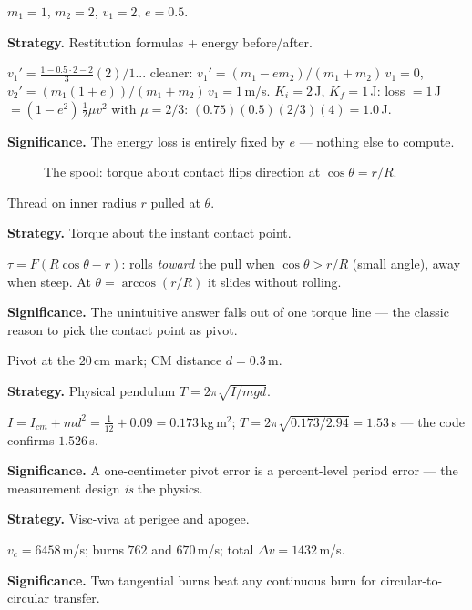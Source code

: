 \begin{example}\label{ex:w4}
$m_1=1$, $m_2=2$, $v_1=2$, $e=0.5$.
\par\smallskip
\textbf{Strategy.} Restitution formulas + energy before/after.
\begin{solution}
$v_1'=\frac{1-0.5\cdot2-2}{3}(2)/1$... cleaner:
$v_1'=(m_1-em_2)/(m_1+m_2)\,v_1=0$,
$v_2'=(m_1(1+e))/(m_1+m_2)\,v_1=1$\,m/s.
$K_i=2$\,J, $K_f=1$\,J: loss $=1$\,J $=(1-e^{2})\,\frac12\mu v^{2}$
with $\mu=2/3$: $(0.75)(0.5)(2/3)(4)=1.0$\,J. \checkmark
\end{solution}
\textbf{Significance.} The energy loss is entirely fixed by $e$ ---
nothing else to compute.
\end{example}

\begin{figure}[htbp]\centering

\caption{The spool: torque about contact flips direction at
$\cos\theta=r/R$.}
\label{fig:spool}
\end{figure}

\begin{example}\label{ex:w5}
Thread on inner radius $r$ pulled at $\theta$.
\par\smallskip
\textbf{Strategy.} Torque about the instant contact point.
\begin{solution}
$\tau=F(R\cos\theta-r)$: rolls \emph{toward} the pull when
$\cos\theta>r/R$ (small angle), away when steep. At
$\theta=\arccos(r/R)$ it slides without rolling. \checkmark
\end{solution}
\textbf{Significance.} The unintuitive answer falls out of one torque
line --- the classic reason to pick the contact point as pivot.
\end{example}

\begin{example}\label{ex:w6}
Pivot at the $20$\,cm mark; CM distance $d=0.3$\,m.
\par\smallskip
\textbf{Strategy.} Physical pendulum $T=2\pi\sqrt{I/mgd}$.
\begin{solution}
$I=I_{cm}+md^{2}=\tfrac1{12}+0.09=0.173$\,kg\,m$^{2}$;
$T=2\pi\sqrt{0.173/2.94}=1.53$\,s --- the code confirms $1.526$\,s.
\checkmark
\end{solution}
\textbf{Significance.} A one-centimeter pivot error is a percent-level
period error --- the measurement design \emph{is} the physics.
\end{example}

\begin{example}[W7: Hohmann $1.5\to2.5R_E$]\label{ex:w7}
\par\smallskip
\textbf{Strategy.} Visc-viva at perigee and apogee.
\begin{solution}
$v_c=6458$\,m/s; burns $762$ and $670$\,m/s; total
$\Delta v=1432$\,m/s. \checkmark
\end{solution}
\textbf{Significance.} Two tangential burns beat any continuous burn
for circular-to-circular transfer.
\end{example}

